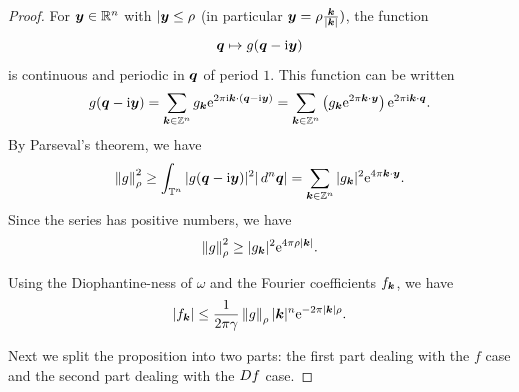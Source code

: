 \documentclass[twoside,letterpaper,11pt]{article}
\numberwithin{equation}{section}
\newcommand{\T}{\mathbb{T}}
\begin{document}
\begin{proof}
  For $\bm{y} \in \mathbb{R}^n$ with $|\bm{y} \leq \rho$ (in particular $\bm{y} = \rho
  \frac{\bm{k}}{|\bm{k}|})$, the function
  \begin{equation*}
    \bm{q} \mapsto g(\bm{q} - \mathrm{i} \bm{y})
  \end{equation*}
  is continuous and periodic in $\bm{q}$ of period $1$.
  This function can be written
  \begin{equation*}
    g(\bm{q} - \mathrm{i} \bm{y}) = \sum_{\bm{k} \in \mathbb{Z}^n} g_{\bm{k}} \mathrm{e}^{2 \pi \mathrm{i}
      \bm{k} \cdot (\bm{q} - \mathrm{i} \bm{y})} = \sum_{\bm{k} \in \mathbb{Z}^n}
    \left(g_{\bm{k}} \mathrm{e}^{2 \pi \bm{k} \cdot \bm{y}} \right) \mathrm{e}^{2 \pi \mathrm{i} \bm{k}
      \cdot \bm{q}}.
  \end{equation*}
  By Parseval's theorem, we have
  \begin{equation*}
    \norm{g}_{\rho}^2 \geq \int_{\T^n} |g(\bp{q} - \i \bp{y})|^2 |\dif ^n
    \bp{q}| = \sum_{\bp{k} \in \Z^n} |g_{\bp{k}}|^2 \e^{4 \pi \bp{k} \cdot \bp{y}}.
  \end{equation*}
  Since the series has positive numbers, we have
  \begin{equation*}
    \norm{g}_{\rho}^2 \geq |g_{\bp{k}}|^2 \e^{4 \pi \rho|\bp{k}|}.
  \end{equation*}

  Using the Diophantine-ness of $\omega$ and the Fourier coefficients
  $f_{\bm{k}}$, we have
  \begin{equation*}
    |f_{\bp{k}}| \leq \frac{1}{2 \pi \gamma} \norm{g}_{\rho} |\bp{k}|^n \e^{-2
      \pi |\bp{k}| \rho}.
  \end{equation*}

  Next we split the proposition into two parts: the first part dealing with the
  $f$ case and the second part dealing with the $\mathop{}\!D f$ case.


\end{proof}
\end{document}
